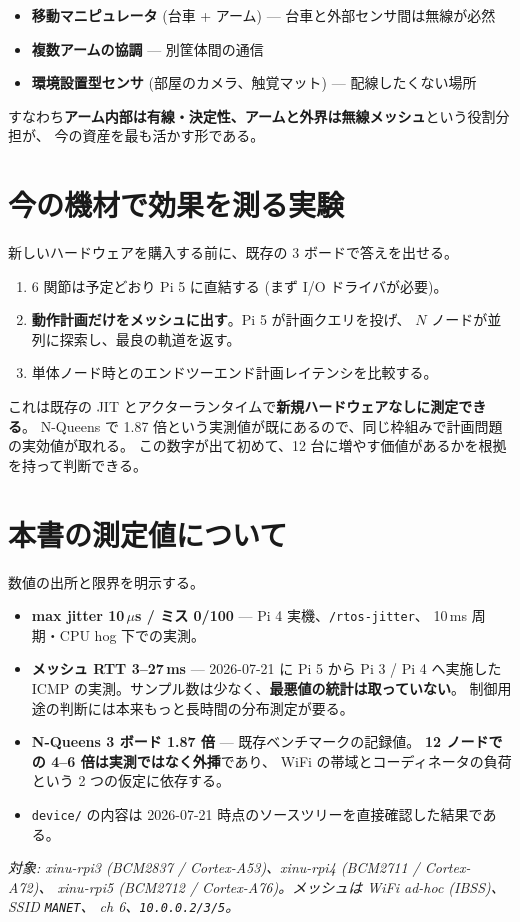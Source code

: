 \documentclass[11pt,a4paper]{article}
\newcommand{\code}[1]{\texttt{#1}}
\begin{document}
\begin{itemize}[leftmargin=1.6em,itemsep=2pt]
\item \textbf{移動マニピュレータ} (台車 + アーム) --- 台車と外部センサ間は無線が必然
\item \textbf{複数アームの協調} --- 別筐体間の通信
\item \textbf{環境設置型センサ} (部屋のカメラ、触覚マット) --- 配線したくない場所
\end{itemize}

すなわち\textbf{アーム内部は有線・決定性、アームと外界は無線メッシュ}という役割分担が、
今の資産を最も活かす形である。

\section{今の機材で効果を測る実験}

新しいハードウェアを購入する前に、既存の 3 ボードで答えを出せる。

\begin{enumerate}[leftmargin=1.6em,itemsep=3pt]
\item 6 関節は予定どおり Pi 5 に直結する (まず I/O ドライバが必要)。
\item \textbf{動作計画だけをメッシュに出す}。Pi 5 が計画クエリを投げ、
      $N$ ノードが並列に探索し、最良の軌道を返す。
\item 単体ノード時とのエンドツーエンド計画レイテンシを比較する。
\end{enumerate}

これは既存の JIT とアクターランタイムで\textbf{新規ハードウェアなしに測定できる}。
N-Queens で 1.87 倍という実測値が既にあるので、同じ枠組みで計画問題の実効値が取れる。
この数字が出て初めて、12 台に増やす価値があるかを根拠を持って判断できる。

\section{本書の測定値について}

数値の出所と限界を明示する。

\begin{itemize}[leftmargin=1.6em,itemsep=2pt]
\item \textbf{max jitter 10\,$\mu$s / ミス 0/100} --- Pi 4 実機、\code{/rtos-jitter}、
      10\,ms 周期・CPU hog 下での実測。
\item \textbf{メッシュ RTT 3--27\,ms} --- 2026-07-21 に Pi 5 から Pi 3 / Pi 4 へ実施した
      ICMP の実測。サンプル数は少なく、\textbf{最悪値の統計は取っていない}。
      制御用途の判断には本来もっと長時間の分布測定が要る。
\item \textbf{N-Queens 3 ボード 1.87 倍} --- 既存ベンチマークの記録値。
      \textbf{12 ノードでの 4--6 倍は実測ではなく外挿}であり、
      WiFi の帯域とコーディネータの負荷という 2 つの仮定に依存する。
\item \code{device/} の内容は 2026-07-21 時点のソースツリーを直接確認した結果である。
\end{itemize}

\vfill
{\small\itshape 対象: xinu-rpi3 (BCM2837 / Cortex-A53)、xinu-rpi4 (BCM2711 / Cortex-A72)、
xinu-rpi5 (BCM2712 / Cortex-A76)。メッシュは WiFi ad-hoc (IBSS)、SSID \code{MANET}、
ch 6、\code{10.0.0.2/3/5}。}
\end{document}
